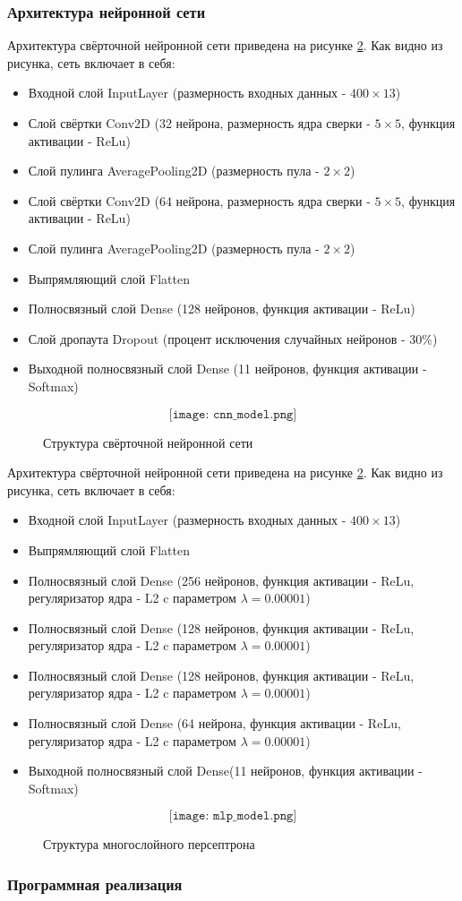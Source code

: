 \subsubsection{Архитектура нейронной сети}
Архитектура свёрточной нейронной сети приведена на рисунке \ref{fig:cnn_model}. Как видно из рисунка, сеть включает в себя:
\begin{itemize}[leftmargin=2cm]
	\item Входной слой InputLayer (размерность входных данных - $400 \times 13$)
	\item Слой свёртки Conv2D (32 нейрона, размерность ядра сверки - $5 \times 5$, функция активации - ReLu)
	\item Слой пулинга AveragePooling2D (размерность пула - $2 \times 2$)
	\item Слой свёртки Conv2D (64 нейрона, размерность ядра сверки - $5 \times 5$, функция активации - ReLu)
	\item Слой пулинга AveragePooling2D (размерность пула - $2 \times 2$)
	\item Выпрямляющий слой Flatten
	\item Полносвязный слой Dense (128 нейронов, функция активации - ReLu)
	\item Слой дропаута Dropout (процент исключения случайных нейронов  - 30\%)
	\item Выходной полносвязный слой Dense (11 нейронов, функция активации - Softmax)
	
\end{itemize}

\begin{figure}[H]
	\[\texttt{[image: cnn\_model.png]}\]
	\caption{Структура свёрточной нейронной сети}
	\label{fig:cnn_model}
\end{figure}

Архитектура свёрточной нейронной сети приведена на рисунке \ref{fig:cnn_model}. Как видно из рисунка, сеть включает в себя:
\begin{itemize}[leftmargin=2cm]
	\item Входной слой InputLayer (размерность входных данных - $400 \times 13$)
	\item Выпрямляющий слой Flatten
	\item Полносвязный слой Dense (256 нейронов, функция активации - ReLu, регуляризатор ядра - L2 c параметром $\lambda = 0.00001$)
	\item Полносвязный слой Dense (128 нейронов, функция активации - ReLu, регуляризатор ядра - L2 c параметром $\lambda = 0.00001$)
	\item Полносвязный слой Dense (128 нейронов, функция активации - ReLu, регуляризатор ядра - L2 c параметром $\lambda = 0.00001$)
	\item Полносвязный слой Dense (64 нейрона, функция активации - ReLu, регуляризатор ядра - L2 c параметром $\lambda = 0.00001$)
	\item Выходной полносвязный слой Dense(11 нейронов, функция активации - Softmax)
\end{itemize}

\begin{figure}[H]
	\[\texttt{[image: mlp\_model.png]}\]
	\caption{Структура многослойного персептрона}
	\label{fig:cnn_model}
\end{figure}
\subsubsection{Программная реализация}

